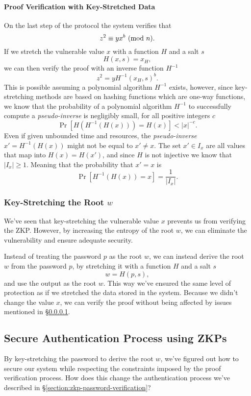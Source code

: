 \newpage
\paragraph{Proof Verification with Key-Stretched Data}
\label{paragraph:problems-with-key-stretch}
On the last step of the protocol the system verifies that
$$ z^2 \equiv yx^b \ (\mathrm{mod}\ n).$$
If we stretch the vulnerable value $x$ with a function $H$ and a salt $s$
$$H(x, s) = x_H,$$
we can then verify the proof with an inverse function $H^{-1}$
$$z^2 = yH^{-1}(x_H, s)^b.$$
This is possible assuming a polynomial algorithm $H^{-1}$ exists, however, since key-stretching methods are based on hashing functions which are one-way functions, we know that the probability of a polynomial algorithm $H^{-1}$ to successfully compute a \textit{pseudo-inverse} is negligibly small, for all positive integers $c$ \cite{goldreich2007foundations}
$$\Pr[H(H^{-1}(H(x))) = H(x)] < |x|^{-c}.$$
Even if given unbounded time and resources, the \textit{pseudo-inverse} $x' = H^{-1}(H(x))$ might not be equal to $x' \not = x$. 
The set $x'\in I_x$ are all values that map into $H(x) = H(x')$, and since $H$ is not injective we know that $|I_x| \ge 1$.
Meaning that the probability that $x' = x$ is
\medskip
$$\Pr[H^{-1}(H(x)) = x] = \frac{1}{|I_x|}.$$

\subsubsection{Key-Stretching the Root $w$}
We've seen that key-stretching the vulnerable value $x$ prevents us from verifying the ZKP.
However, by increasing the entropy of the root $w$, we can eliminate the vulnerability and ensure adequate security.

\bigskip
\noindent Instead of treating the password $p$ as the root $w$, we can instead derive the root $w$ from the password $p$, by stretching it with a function $H$ and a salt $s$
$$w = H(p, s),$$
and use the output as the root $w$.
This way we've ensured the same level of protection as if we stretched the data stored in the system.
Because we didn't change the value $x$, we can verify the proof without being affected by issues mentioned in \S\ref{paragraph:problems-with-key-stretch}.

\newpage
\subsection{Secure Authentication Process using ZKPs}
By key-stretching the password to derive the root $w$, we've figured out how to secure our system while respecting the constraints imposed by the proof verification process.
How does this change the authentication process we've described in \S\ref{section:zkp-password-verification}?

